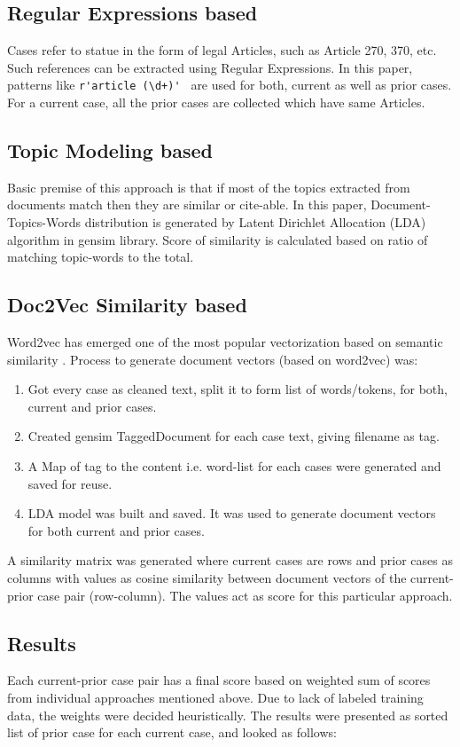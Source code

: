 \subsection{Regular Expressions based}
Cases refer to statue in the form of legal Articles, such as Article 270, 370, etc. Such references can be extracted using Regular Expressions. In this paper, patterns like \lstinline|r'article (\d+)' | are used for both, current as well as prior cases. For a current case, all the prior cases are collected which have same Articles.

\subsection{Topic Modeling based}
Basic premise of this approach is that if most of the topics extracted from documents match then they are similar or cite-able. In this paper, Document-Topics-Words distribution is generated by Latent Dirichlet Allocation (LDA) algorithm in gensim library\cite{gensim}. Score of similarity is calculated based on ratio of matching topic-words to the total.

\subsection{Doc2Vec Similarity based}
Word2vec has emerged one of the most popular vectorization based on semantic similarity \cite{word2vec}. Process to generate document vectors (based on word2vec) was:
\begin{enumerate}
	\item Got every case as cleaned text, split it to form list of words/tokens, for both, current and prior cases.
	\item Created gensim TaggedDocument for each case text, giving filename as tag.
	\item A Map of tag to the content i.e. word-list for each cases were generated and saved for reuse.
	\item LDA model was built and saved. It was used to generate document vectors for both current and prior cases.
\end{enumerate}
A similarity matrix was generated where current cases are rows and prior cases as columns with values as cosine similarity between document vectors of the current-prior case pair (row-column). The values act as score for this particular approach.

\subsection{Results}
Each current-prior case pair has a final score based on weighted sum of scores from individual approaches mentioned above. Due to lack of labeled training data, the weights were decided heuristically. The results were presented as sorted list of prior case for each current case, and looked as follows:

